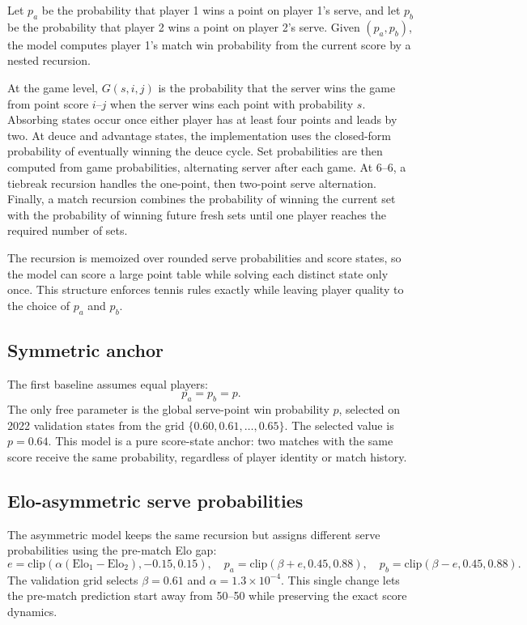 \documentclass{article} %
\begin{document}
Let $p_a$ be the probability that player 1 wins a point on player 1's serve,
and let $p_b$ be the probability that player 2 wins a point on player 2's
serve. Given $(p_a,p_b)$, the model computes player 1's match win probability
from the current score by a nested recursion.

At the game level, $G(s,i,j)$ is the probability that the server wins the game
from point score $i$--$j$ when the server wins each point with probability $s$.
Absorbing states occur once either player has at least four points and leads by
two. At deuce and advantage states, the implementation uses the closed-form
probability of eventually winning the deuce cycle. Set probabilities are then
computed from game probabilities, alternating server after each game. At
6--6, a tiebreak recursion handles the one-point, then two-point serve
alternation. Finally, a match recursion combines the probability of winning the
current set with the probability of winning future fresh sets until one player
reaches the required number of sets.

The recursion is memoized over rounded serve probabilities and score states, so
the model can score a large point table while solving each distinct state only
once. This structure enforces tennis rules exactly while leaving player quality
to the choice of $p_a$ and $p_b$.

\subsection{Symmetric anchor}

The first baseline assumes equal players:
\[
    p_a = p_b = p.
\]
The only free parameter is the global serve-point win probability $p$, selected
on 2022 validation states from the grid $\{0.60,0.61,\ldots,0.65\}$. The
selected value is $p=0.64$. This model is a pure score-state anchor: two
matches with the same score receive the same probability, regardless of player
identity or match history.

\subsection{Elo-asymmetric serve probabilities}

The asymmetric model keeps the same recursion but assigns different serve
probabilities using the pre-match Elo gap:
\[
    e = \mathrm{clip}(\alpha(\mathrm{Elo}_1-\mathrm{Elo}_2), -0.15, 0.15),
    \quad
    p_a = \mathrm{clip}(\beta + e, 0.45, 0.88),
    \quad
    p_b = \mathrm{clip}(\beta - e, 0.45, 0.88).
\]
The validation grid selects $\beta=0.61$ and $\alpha=1.3\times 10^{-4}$. This
single change lets the pre-match prediction start away from 50--50 while
preserving the exact score dynamics.
\end{document}
